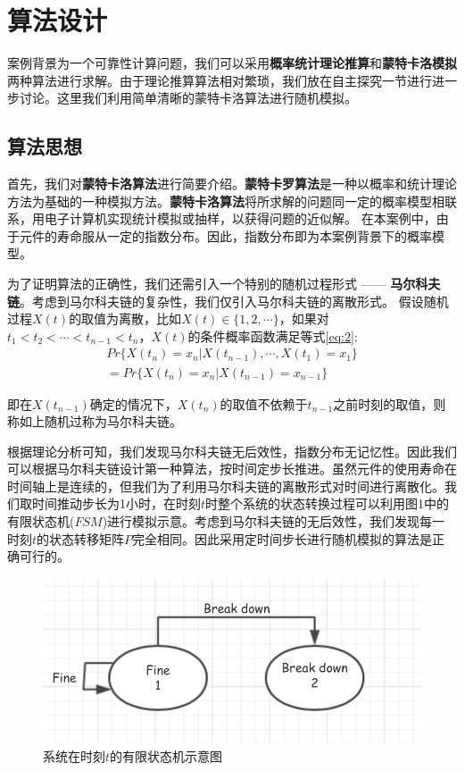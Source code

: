 \documentclass[10.5pt,twocolumn]{jbuaa}
\begin{document}
\section{算法设计}
案例背景为一个可靠性计算问题，我们可以采用\textbf{概率统计理论推算}和\textbf{蒙特卡洛模拟}两种算法进行求解。由于理论推算算法相对繁琐，我们放在自主探究一节进行进一步讨论。这里我们利用简单清晰的蒙特卡洛算法进行随机模拟。
\subsection{算法思想}
首先，我们对\textbf{蒙特卡洛算法}进行简要介绍。\textbf{蒙特卡罗算法}是一种以概率和统计理论方法为基础的一种模拟方法。\textbf{蒙特卡洛算法}将所求解的问题同一定的概率模型相联系，用电子计算机实现统计模拟或抽样，以获得问题的近似解\cite{cite2}。 在本案例中，由于元件的寿命服从一定的指数分布。因此，指数分布即为本案例背景下的概率模型。

为了证明算法的正确性，我们还需引入一个特别的随机过程形式 —— \textbf{马尔科夫链}。考虑到马尔科夫链的复杂性，我们仅引入马尔科夫链的离散形式\cite{cite4}。 假设随机过程$X(t)$的取值为离散，比如$X(t) \in \{1, 2, \cdots \}$，如果对$t_1 < t_2 < \cdots < t_{n - 1} < t_{n}$，$X(t)$的条件概率函数满足等式\eqref{eq:2}:
\begin{equation} \label{eq:2}
\begin{split}
	Pr
	\{X(t_n) = x_n  | X(t_{n - 1}), \cdots,  X(t_1) = x_1\}
	\\
	  = Pr\{X(t_n) = x_n | X(t_{n - 1}) = x_{n - 1}\}
\end{split}
\end{equation}

即在$X(t_{n - 1})$确定的情况下，$X(t_n)$的取值不依赖于$t_{n - 1}$之前时刻的取值，则称如上随机过称为马尔科夫链。

根据理论分析可知，我们发现马尔科夫链无后效性，指数分布无记忆性。因此我们可以根据马尔科夫链设计第一种算法，按时间定步长推进。虽然元件的使用寿命在时间轴上是连续的，但我们为了利用马尔科夫链的离散形式对时间进行离散化。我们取时间推动步长为1小时，在时刻$t$时整个系统的状态转换过程可以利用图1中的有限状态机($FSM$)进行模拟示意。考虑到马尔科夫链的无后效性，我们发现每一时刻$t$的状态转移矩阵$P$完全相同。因此采用定时间步长进行随机模拟的算法是正确可行的。

\begin{figure}[H]
\centering
	\includegraphics[scale = 0.5]{fig1}
	\caption{系统在时刻$t$的有限状态机示意图}
\end{figure}
\end{document}
